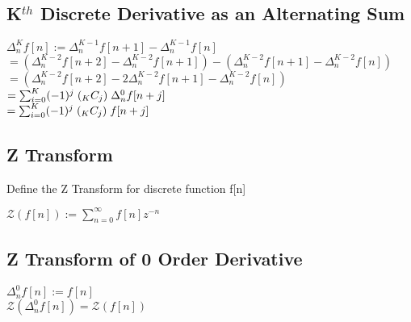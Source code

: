 \documentclass[11pt]{article}
\begin{document}
\subsection{K$^{th}$ Discrete Derivative as an Alternating Sum}
\begin{center}
$
\Delta_n^K f[n] := \Delta_n^{K-1} f[n+1] - \Delta_n^{K-1} f[n]
$
\\ \vspace{4mm}
$
= (\Delta_n^{K-2} f[n+2] - \Delta_n^{K-2} f[n+1]) - (\Delta_n^{K-2} f[n+1] - \Delta_n^{K-2} f[n])
$
\\ \vspace{4mm}
$
= (\Delta_n^{K-2} f[n+2] - 2\Delta_n^{K-2} f[n+1] - \Delta_n^{K-2} f[n])
$
\\ \vspace{4mm}
$
=  \sum_{i=0}^K (-1)^{j} \hspace{1mm} (_K C _j) \hspace{1mm} \Delta_n^{0} f[n + j]
$
\\ \vspace{4mm}
$
= \sum_{i=0}^K (-1)^{j} \hspace{1mm} (_K C _j) \hspace{1mm} f[n + j]
$
\end{center}








\subsection{Z Transform}
Define the Z Transform for discrete function f[n]
\begin{center}
$
\mathcal{Z}(f[n]) := \sum_{n=0}^{\infty}f[n]z^{-n}
$
\end{center}





\subsection{Z Transform of 0 Order Derivative}
\begin{center}
\vspace{1mm}
$
\Delta_n^0 f[n] := f[n]
$
\\ \vspace{3mm}
$
\mathcal{Z}(\Delta_n^0 f[n]) = \mathcal{Z}(f[n])
$
\end{center}
\end{document}
